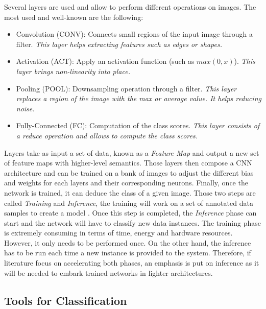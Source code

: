 Several layers are used and allow to perform different operations on images. The most used and well-known are the following:
\begin{itemize}
  \item Convolution   (CONV): Connects small regions of the input image through a filter. \emph{This layer helps extracting features such as edges or shapes.}
  \item Activation     (ACT): Apply an activation function (such as $max(0,x)$). \emph{This layer brings non-linearity into place.}
  \item Pooling       (POOL): Downsampling operation through a filter. \emph{This layer replaces a region of the image with the max or average value. It helps reducing noise.}
  \item Fully-Connected (FC): Computation of the class scores. \emph{This layer consists of a reduce operation and allows to compute the class scores.}
\end{itemize}

Layers take as input a set of data, known as a \emph{Feature Map} and output a new set of feature maps with higher-level semantics. Those layers then compose a CNN architecture and can be trained on a bank of images to adjust the different bias and weights for each layers and their corresponding neurons. Finally, once the network is trained, it can deduce the class of a given image. Those two steps are called \emph{Training} and \emph{Inference}, the training will work on a set of annotated data samples to create a model  \cite{Abdelouahab2018}. Once this step is completed, the \emph{Inference} phase can start and the network will have to classify new data instances. The training phase is extremely consuming in terms of time, energy and hardware resources. However, it only needs to be performed once. On the other hand, the inference has to be run each time a new instance is provided to the system. Therefore, if literature focus on accelerating both phases, an emphasis is put on inference as it will be needed to embark trained networks in lighter architectures.


\subsection{Tools for Classification}

